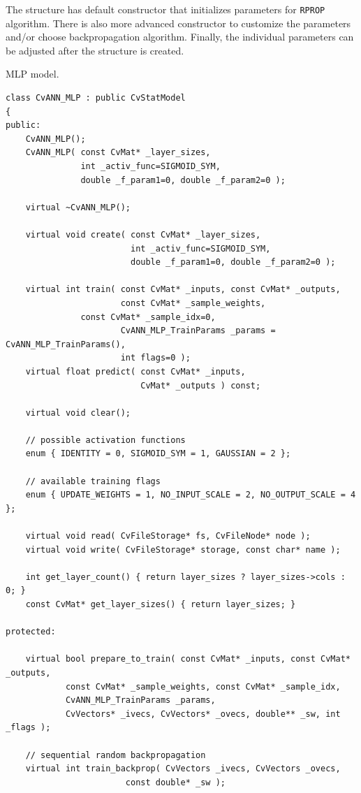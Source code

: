 The structure has default constructor that initializes parameters for \texttt{RPROP} algorithm. There is also more advanced constructor to customize the parameters and/or choose backpropagation algorithm. Finally, the individual parameters can be adjusted after the structure is created.



MLP model.

\begin{lstlisting}
class CvANN_MLP : public CvStatModel
{
public:
    CvANN_MLP();
    CvANN_MLP( const CvMat* _layer_sizes,
               int _activ_func=SIGMOID_SYM,
               double _f_param1=0, double _f_param2=0 );

    virtual ~CvANN_MLP();

    virtual void create( const CvMat* _layer_sizes,
                         int _activ_func=SIGMOID_SYM,
                         double _f_param1=0, double _f_param2=0 );

    virtual int train( const CvMat* _inputs, const CvMat* _outputs,
                       const CvMat* _sample_weights, 
		       const CvMat* _sample_idx=0,
                       CvANN_MLP_TrainParams _params = CvANN_MLP_TrainParams(),
                       int flags=0 );
    virtual float predict( const CvMat* _inputs,
                           CvMat* _outputs ) const;

    virtual void clear();

    // possible activation functions
    enum { IDENTITY = 0, SIGMOID_SYM = 1, GAUSSIAN = 2 };

    // available training flags
    enum { UPDATE_WEIGHTS = 1, NO_INPUT_SCALE = 2, NO_OUTPUT_SCALE = 4 };

    virtual void read( CvFileStorage* fs, CvFileNode* node );
    virtual void write( CvFileStorage* storage, const char* name );

    int get_layer_count() { return layer_sizes ? layer_sizes->cols : 0; }
    const CvMat* get_layer_sizes() { return layer_sizes; }

protected:

    virtual bool prepare_to_train( const CvMat* _inputs, const CvMat* _outputs,
            const CvMat* _sample_weights, const CvMat* _sample_idx,
            CvANN_MLP_TrainParams _params,
            CvVectors* _ivecs, CvVectors* _ovecs, double** _sw, int _flags );

    // sequential random backpropagation
    virtual int train_backprop( CvVectors _ivecs, CvVectors _ovecs, 
						const double* _sw );


\end{lstlisting}
